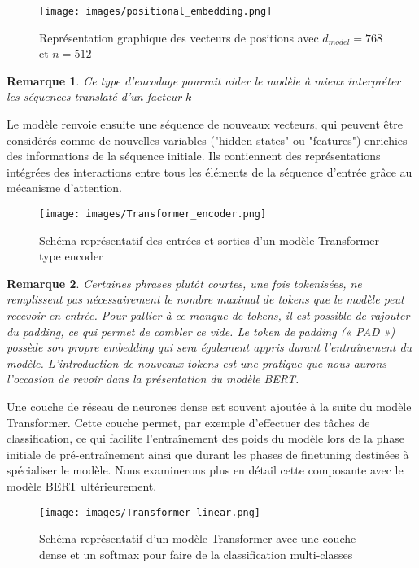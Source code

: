 \documentclass[12pt]{article}
\newtheorem{rmq}{Remarque}
\theoremstyle{definition}
\begin{document}
		\begin{figure*}[!h]
	\centering
	\texttt{[image: images/positional\_embedding.png]}
	\caption{Représentation graphique des vecteurs de positions avec $d_{model} = 768$ et $n=512$}
\end{figure*}

\begin{rmq}
	Ce type d’encodage pourrait aider le modèle à mieux interpréter les séquences translaté d'un facteur $k$
\end{rmq}

Le modèle renvoie ensuite une séquence de nouveaux vecteurs, qui peuvent être considérés comme de nouvelles variables ("hidden states" ou "features") enrichies des informations de la séquence initiale. Ils contiennent des représentations intégrées des interactions entre tous les éléments de la séquence d'entrée grâce au mécanisme d'attention.

\begin{figure*}[!h]
	\centering
	\texttt{[image: images/Transformer\_encoder.png]}
	\caption{Schéma représentatif des entrées et sorties d'un modèle Transformer type encoder}
\end{figure*}

\begin{rmq}
	Certaines phrases plutôt courtes, une fois tokenisées, ne remplissent pas nécessairement le nombre maximal de tokens que le modèle peut recevoir en entrée. Pour pallier à ce manque de tokens, il est possible de rajouter du padding, ce qui permet de combler ce vide. Le token de padding (« PAD ») possède son propre embedding qui sera également appris durant l'entraînement du modèle. L'introduction de nouveaux tokens est une pratique que nous aurons l'occasion de revoir dans la présentation du modèle BERT.   
\end{rmq}

Une couche de réseau de neurones dense est souvent ajoutée à la suite du modèle Transformer. Cette couche permet, par exemple d'effectuer des tâches de classification, ce qui facilite l'entraînement des poids du modèle lors de la phase initiale de pré-entraînement ainsi que durant les phases de finetuning destinées à spécialiser le modèle. Nous examinerons plus en détail cette composante avec le modèle BERT ultérieurement.

\begin{figure*}[!h]
	\centering
	\texttt{[image: images/Transformer\_linear.png]}
	\caption{Schéma représentatif d'un modèle Transformer avec une couche dense et un softmax pour faire de la classification multi-classes}
\end{figure*}
\end{document}
